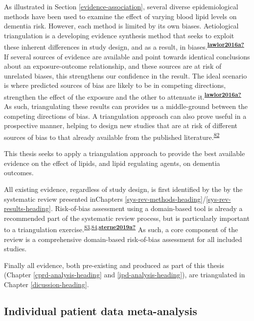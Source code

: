 \documentclass[a4paper, twoside]{templates/ociamthesis}
\begin{document}
As illustrated in Section \ref{evidence-association}, several diverse epidemiological methods have been used to examine the effect of varying blood lipid levels on dementia risk. However, each method is limited by its own biases. Aetiological triangulation is a developing evidence synthesis method that seeks to exploit these inherent differences in study design, and as a result, in biases.\textsuperscript{\protect\hyperlink{ref-lawlor2016a}{\textbf{lawlor2016a?}}} If several sources of evidence are available and point towards identical conclusions about an exposure-outcome relationship, and these sources are at risk of unrelated biases, this strengthens our confidence in the result. The ideal scenario is where predicted sources of bias are likely to be in competing directions, strengthen the effect of the exposure and the other to attenuate it.\textsuperscript{\protect\hyperlink{ref-lawlor2016a}{\textbf{lawlor2016a?}}} As such, triangulating these results can provides us a middle-ground between the competing directions of bias. A triangulation approach can also prove useful in a prospective manner, helping to design new studies that are at risk of different sources of bias to that already available from the published literature.\textsuperscript{\protect\hyperlink{ref-munafo2018}{82}}

This thesis seeks to apply a triangulation approach to provide the best available evidence on the effect of lipids, and lipid regulating agents, on dementia outcomes.

All existing evidence, regardless of study design, is first identified by the by the systematic review presented inChapters \ref{sys-rev-methods-heading}/\ref{sys-rev-results-heading}. Risk-of-bias assessment using a domain-based tool is already a recommended part of the systematic review process, but is particularly important to a triangulation exercise.\textsuperscript{\protect\hyperlink{ref-page2021}{83},\protect\hyperlink{ref-mcguinness2018}{84},\protect\hyperlink{ref-sterne2019a}{\textbf{sterne2019a?}}} As such, a core component of the review is a comprehensive domain-based risk-of-bias assessment for all included studies.

Finally all evidence, both pre-existing and produced as part of this thesis (Chapter \ref{cprd-analysis-heading} and \ref{ipd-analysis-heading}), are triangulated in Chapter \ref{dicussion-heading}.

\hypertarget{individual-patient-data-meta-analysis}{%
\subsection{Individual patient data meta-analysis}\label{individual-patient-data-meta-analysis}}
\end{document}
